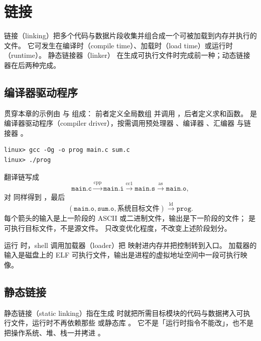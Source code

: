 \chapter{链接}

链接（linking）把多个代码与数据片段收集并组合成一个可被加载到内存并执行的文件。
它可发生在编译时（compile time）、加载时（load time）或运行时（runtime）。
静态链接器（linker） 在生成可执行文件时完成前一种；动态链接器在后两种完成。

\section{编译器驱动程序}



贯穿本章的示例由  与  组成：
前者定义全局数组  并调用 ，后者定义求和函数。
 是编译器驱动程序（compiler driver），按需调用预处理器 、编译器 、汇编器  与链接器 。

\begin{lstlisting}
linux> gcc -Og -o prog main.c sum.c
linux> ./prog
\end{lstlisting}

翻译链写成
\[
\texttt{main.c}
\xrightarrow{\mathrm{cpp}}
\texttt{main.i}
\xrightarrow{\mathrm{cc1}}
\texttt{main.s}
\xrightarrow{\mathrm{as}}
\texttt{main.o},
\]
对  同样得到 ，最后
\[
(\texttt{main.o},\texttt{sum.o},\text{系统目标文件})
\xrightarrow{\mathrm{ld}}
\texttt{prog}.
\]
每个箭头的输入是上一阶段的 ASCII 或二进制文件，输出是下一阶段的文件；
 是可执行目标文件，不是源文件。
 只改变优化程度，不改变上述阶段划分。

运行  时，shell 调用加载器（loader）把  映射进内存并把控制转到入口。
加载器的输入是磁盘上的 ELF 可执行文件，输出是进程的虚拟地址空间中一段可执行映像。

\section{静态链接}

静态链接（static linking）指在生成  时就把所需目标模块的代码与数据拷入可执行文件，运行时不再依赖那些  或静态库 。
它不是「运行时指令不能改」，也不是把操作系统、堆、栈一并拷进 。

